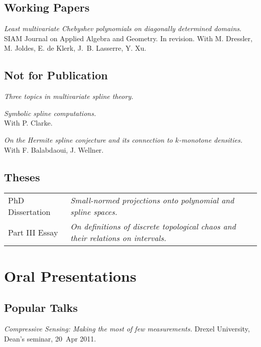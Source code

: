 \documentclass[11pt]{article}
\begin{document}
\subsection{Working Papers}
\betaremune
\item {\sl Least multivariate Chebyshev polynomials on diagonally determined domains}.\\
SIAM Journal on Applied Algebra and Geometry. In revision.
With M.  Dressler, M.  Joldes, E. de Klerk, J.~B. Lasserre,  Y. Xu.
\eetaremune

\subsection{Not for Publication}
\betaremune
\item {\sl Three topics in multivariate spline theory.}
\item {\sl Symbolic spline computations.}\\
 With P. Clarke.
\item {\sl On the Hermite spline conjecture and its connection to $k$-monotone densities.}\\
With F. Balabdaoui, J. Wellner.
\eetaremune

\subsection{Theses}
\begin{tabular}{ll}
PhD Dissertation & {\sl Small-normed projections onto polynomial and spline spaces.}\\
Part III Essay & {\sl On definitions of discrete topological chaos and their relations on intervals.}
\end{tabular}


\section{Oral Presentations}

\subsection{Popular Talks}
\betaremune
\item {\sl Compressive Sensing: Making the most of few measurements.}
Drexel University, Dean's seminar, 20~Apr 2011.
\eetaremune
\end{document}

